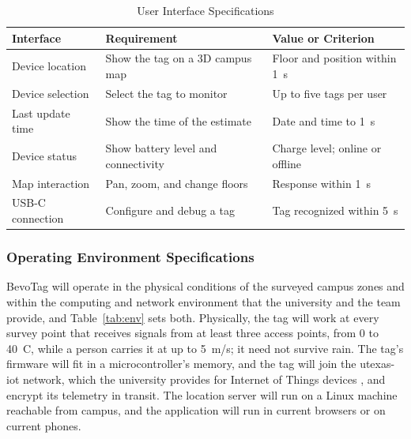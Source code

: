 \documentclass[12pt,letterpaper]{article}
\newenvironment{spectable}{\setstretch{1.0}\renewcommand{\arraystretch}{1.1}}{}
\begin{document}
\begin{table}[!htb]
\caption{User Interface Specifications}
\label{tab:ui}
\centering
\begin{spectable}
\begin{tabularx}{\linewidth}{@{}L{1.4in} Y L{2.4in}@{}}
\toprule
\textbf{Interface} & \textbf{Requirement} & \textbf{Value or Criterion} \\
\midrule
Device location & Show the tag on a 3D campus map & Floor and position within 1~s \\
Device selection & Select the tag to monitor & Up to five tags per user \\
Last update time & Show the time of the estimate & Date and time to 1~s \\
Device status & Show battery level and connectivity & Charge level; online or offline \\
Map interaction & Pan, zoom, and change floors & Response within 1~s \\
USB-C connection & Configure and debug a tag & Tag recognized within 5~s \\
\bottomrule
\end{tabularx}
\end{spectable}
\end{table}

\subsubsection{Operating Environment Specifications}
BevoTag will operate in the physical conditions of the surveyed campus zones and within the
computing and network environment that the university and the team provide, and
Table~\ref{tab:env} sets both. Physically, the tag will work at every survey
point that receives signals from at least three access points, from 0 to 40~\textdegree C, while a
person carries it at up to 5~m/s; it need not survive rain. The tag's firmware will fit in a
microcontroller's memory, and the tag will join the utexas-iot network, which the university
provides for Internet of Things devices \cite{utiot}, and encrypt its telemetry in transit. The
location server will run on a Linux machine reachable from campus, and the application will run in
current browsers or on current phones.
\end{document}
